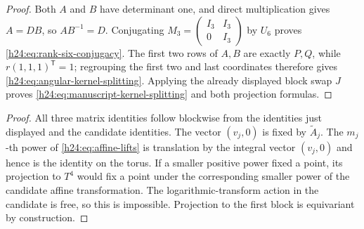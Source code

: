 \begin{proof}
Both $A$ and $B$ have determinant one, and direct multiplication gives
$A=DB$, so $AB^{-1}=D$.  Conjugating
$M_3=\left(\begin{smallmatrix}I_3&I_3\\0&I_3\end{smallmatrix}\right)$
by $U_6$ proves \eqref{h24:eq:rank-six-conjugacy}.  The first two rows of
$A,B$ are exactly $P,Q$, while $r(1,1,1)^{\mathsf T}=1$; regrouping the
first two and last coordinates therefore gives
\eqref{h24:eq:angular-kernel-splitting}.  Applying the already displayed block
swap $J$ proves \eqref{h24:eq:manuscript-kernel-splitting} and both projection
formulas.
\end{proof}


\begin{proof}
All three matrix identities follow blockwise from the identities just
displayed and the candidate identities.  The vector $(v_j,0)$ is fixed by
$\widetilde A_j$.  The $m_j$-th power of \eqref{h24:eq:affine-lifts} is
translation by the integral vector $(v_j,0)$ and hence is the identity on
the torus.  If a smaller positive power fixed a point, its projection to
$T^4$ would fix a point under the corresponding smaller power of the
candidate affine transformation.  The logarithmic-transform action in the
candidate is free, so this is impossible.  Projection to the first block is
equivariant by construction.
\end{proof}


